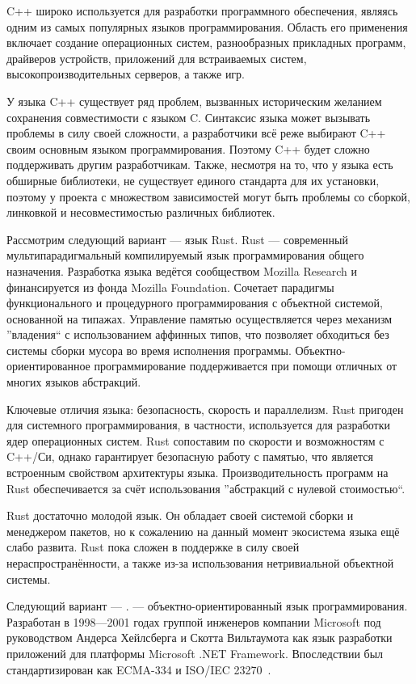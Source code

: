 C++ широко используется для разработки программного обеспечения, являясь одним из самых популярных языков программирования. Область его применения включает создание операционных систем, разнообразных прикладных программ, драйверов устройств, приложений для встраиваемых систем, высокопроизводительных серверов, а также игр.

У языка C++ существует ряд проблем, вызванных историческим желанием сохранения совместимости с языком C. Синтаксис языка может вызывать проблемы в силу своей сложности, а разработчики всё реже выбирают C++ своим основным языком программирования. Поэтому C++ будет сложно поддерживать другим разработчикам. Также, несмотря на то, что у языка есть обширные библиотеки, не существует единого стандарта для их установки, поэтому у проекта с множеством зависимостей могут быть проблемы со сборкой, линковкой и несовместимостью различных библиотек.


Рассмотрим следующий вариант — язык Rust. Rust — современный мультипарадигмальный компилируемый язык программирования общего назначения. Разработка языка ведётся сообществом Mozilla Research и финансируется из фонда Mozilla Foundation. Сочетает парадигмы функционального и процедурного программирования с объектной системой, основанной на типажах. Управление памятью осуществляется через механизм ''владения`` с использованием аффинных типов, что позволяет обходиться без системы сборки мусора во время исполнения программы. Объектно-ориентированное программирование поддерживается при помощи отличных от многих языков абстракций.

Ключевые отличия языка: безопасность, скорость и параллелизм. Rust пригоден для системного программирования, в частности, используется для разработки ядер операционных систем. Rust сопоставим по скорости и возможностям с C++/Си, однако гарантирует безопасную работу с памятью, что является встроенным свойством архитектуры языка. Производительность программ на Rust обеспечивается за счёт использования ''абстракций с нулевой стоимостью``.

Rust достаточно молодой язык. Он обладает своей системой сборки и менеджером пакетов, но к сожалению на данный момент экосистема языка ещё слабо развита. Rust пока сложен в поддержке в силу своей нераспространённости, а также из-за использования нетривиальной объектной системы.


Следующий вариант — \csharp. \csharp — объектно-ориентированный язык программирования. Разработан в 1998—2001 годах группой инженеров компании Microsoft под руководством Андерса Хейлсберга и Скотта Вильтаумота как язык разработки приложений для платформы Microsoft .NET Framework. Впоследствии был стандартизирован как ECMA-334 и ISO/IEC 23270~\cite{wiki_dodiez}.

